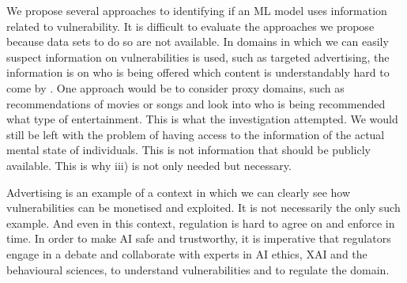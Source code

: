 \documentclass[11pt,theapa]{article}
\theoremstyle{plain}
\begin{document}
We propose several approaches to identifying if an ML model uses information related to vulnerability. It is difficult to evaluate the approaches we propose because data sets to do so are not available. In domains in which we can easily suspect information on vulnerabilities is used, such as targeted advertising, the information is on who is being offered which content is understandably hard to come by \cite{fare2022}. One approach would be to consider proxy domains, such as recommendations of movies or songs and look into who is being recommended what type of entertainment. This is what the \cite{TikTokWSJ} investigation attempted.  We would still be left with the problem of having access to the information of the actual mental state of individuals.  This is not information that should be publicly available. This is why iii) is not only needed but necessary. 

Advertising is an example of a context in which we can clearly see how vulnerabilities can be monetised and exploited. It is not necessarily the only such example. And even in this context, regulation is hard to agree on and enforce in time. In order to make AI safe and trustworthy, it is imperative that regulators engage in a debate and collaborate with experts in AI ethics, XAI and the behavioural sciences, to understand vulnerabilities and to regulate the domain.  

\end{document}
